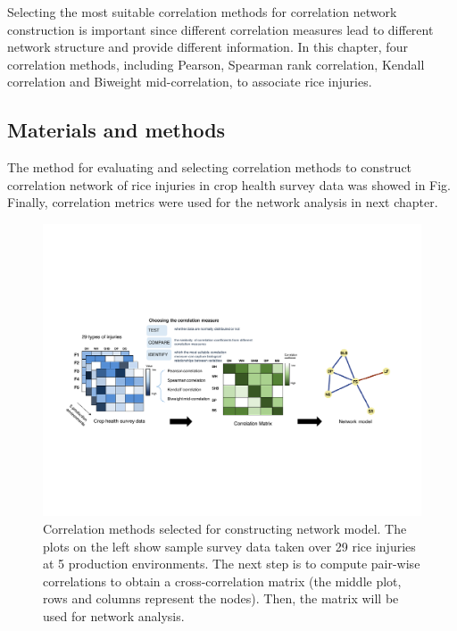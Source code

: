 Selecting the most suitable correlation methods for correlation network construction is important since different correlation measures lead to different network structure and provide different information. In this chapter, four correlation methods, including Pearson, Spearman rank correlation, Kendall correlation \citep{Prokhorov_2001_Kendall} and Biweight mid-correlation, to associate rice injuries. 
 

\subsection*{Materials and methods}

The method for evaluating and selecting correlation methods to construct correlation network of rice injuries in crop health survey data was showed in Fig. Finally, correlation metrics were used for the network analysis in next chapter.

\begin{figure}
    \centering
     \includegraphics[width = 1\textwidth]{figures/pipeline4/pipeline4.pdf}
    \caption{Correlation methods selected for constructing network model. The plots on the left show sample survey data taken over 29 rice injuries at 5 production environments. The next step is to compute pair-wise correlations to obtain a cross-correlation matrix (the middle plot, rows and columns represent the nodes). Then, the matrix will be used for network analysis.}
    \label{fig:pipeline1}
\end{figure}

